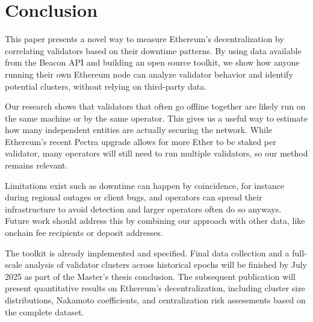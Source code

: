 \documentclass[runningheads]{llncs}
\begin{document}
\section{Conclusion}

This paper presents a novel way to measure Ethereum’s decentralization by correlating validators based on their downtime patterns. By using data available from the Beacon API and building an open source toolkit, we show how anyone running their own Ethereum node can analyze validator behavior and identify potential clusters, without relying on third-party data.

Our research shows that validators that often go offline together are likely run on the same machine or by the same operator. This gives us a useful way to estimate how many independent entities are actually securing the network. While Ethereum’s recent Pectra upgrade allows for more Ether to be staked per validator, many operators will still need to run multiple validators, so our method remains relevant.

Limitations exist such as downtime can happen by coincidence, for instance during regional outages or client bugs, and operators can spread their infrastructure to avoid detection and larger operators often do so anyways. Future work should address this by combining our approach with other data, like onchain fee recipients or deposit addresses.

The toolkit is already implemented and specified. Final data collection and a full-scale analysis of validator clusters across historical epochs will be finished by July 2025 as part of the Master’s thesis conclusion. The subsequent publication will present quantitative results on Ethereum’s decentralization, including cluster size distributions, Nakamoto coefficients, and centralization risk assessments based on the complete dataset.





\printbibliography
\end{document}
